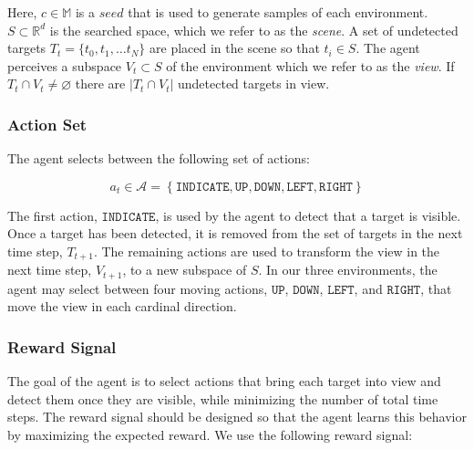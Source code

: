Here, \(c \in \mathbb{M}\) is a \(seed\) that is used to generate samples of each environment.
\(S \subset \mathbb{R}^d\) is the searched space, which we refer to as the \textit{scene}.
A set of undetected targets \(T_t = \{t_0, t_1, \dots t_N\}\) are placed in the scene so that \(t_i \in S\).
The agent perceives a subspace \(V_t \subset S\) of the environment which we refer to as the \textit{view}.
If \(T_t \cap V_t \neq \varnothing\) there are \(\left\lvert T_t \cap V_t \right\rvert\) undetected targets in view.




\subsubsection{Action Set}

The agent selects between the following set of actions:

\begin{equation}
    a_t \in \mathcal{A} = \left\lbrace \mathtt{INDICATE}, \mathtt{UP}, \mathtt{DOWN}, \mathtt{LEFT}, \mathtt{RIGHT} \right\rbrace
\end{equation}

The first action, \(\mathtt{INDICATE}\), is used by the agent to detect that a target is visible.
Once a target has been detected, it is removed from the set of targets in the next time step, \(T_{t+1}\).
The remaining actions are used to transform the view in the next time step, \(V_{t+1}\), to a new subspace of \(S\).
In our three environments, the agent may select between four moving actions, \(\mathtt{UP}\), \(\mathtt{DOWN}\), \(\mathtt{LEFT}\), and \(\mathtt{RIGHT}\), that move the view in each cardinal direction.

\subsubsection{Reward Signal}

The goal of the agent is to select actions that bring each target into view and detect them once they are visible, while minimizing the number of total time steps.
The reward signal should be designed so that the agent learns this behavior by maximizing the expected reward.
We use the following reward signal:

